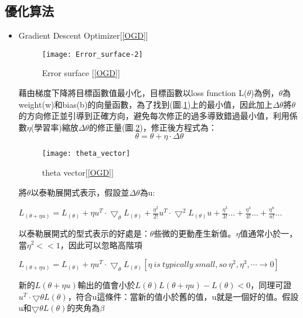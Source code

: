 \subsection{優化算法}
\renewcommand{\baselinestretch}{1}

\begin{itemize}
\item Gradient Descent Optimizer[\ref{OGD}]\\

\begin{figure}[hbt!]
\begin{center}
\texttt{[image: Error\_surface-2]}
\caption{\Large Error surface [\ref{OGD}]}
\label{Error_surface-2}
\end{center}
\end{figure}
 藉由梯度下降將目標函數值最小化，目標函數以loss function L($\theta$)為例，$\theta$為weight(w)和bias(b)的向量函數，為了找到(圖.\ref{Error_surface-2})上的最小值，因此加上$\Delta\theta$將$\theta$ 的方向修正並引導到正確方向，避免每次修正的過多導致錯過最小值，利用係數$\eta$(學習率)縮放$\Delta\theta$的修正量(圖.\ref{theta_vector})，修正後方程式為：
$$\theta=\theta+\eta\cdot\Delta\theta$$
\begin{figure}
\begin{center}
\texttt{[image: theta\_vector]}
\caption{\Large theta vector[\ref{OGD}]}
\label{theta_vector}
\end{center}
\end{figure}
\newpage
將$\theta$以泰勒展開式表示，假設並$\Delta\theta$為u:
\begin{center}
$L_{(\theta+\eta u)}=L_{(\theta)}+\eta u^{T}\cdot\bigtriangledown_{\theta} L_{(\theta)}+\frac{\eta^2}{2!}u^T\cdot\bigtriangledown^2 L_{(\theta)}u+\frac{\eta^3}{3!}...+\frac{\eta^4}{4!}...+\frac{\eta^n}{n!}...$\\
\end{center}
以泰勒展開式的型式表示的好處是：$\theta$些微的更動產生新值。$\eta$值通常小於一，當$\eta^2 << 1$，因此可以忽略高階項 
\begin{center}
$L_{(\theta+\eta u)}=L_{(\theta)}+\eta u^{T}\cdot\bigtriangledown_{\theta} L_{(\theta)} [\eta\ is\ typically\ small, so\ \eta^2, \eta^3,\cdots \rightarrow 0]$\\
\end{center}
新的$L(\theta + \eta u)$輸出的值會小於$L(\theta) L(\theta+\eta u) − L(\theta) < 0$，同理可證$u^T\cdot\bigtriangledown\theta L(\theta)$，符合u這條件：當新的值小於舊的值，u就是一個好的值。假設u和$\bigtriangledown\theta L(\theta)$的夾角為$\beta$\\

\end{itemize}
